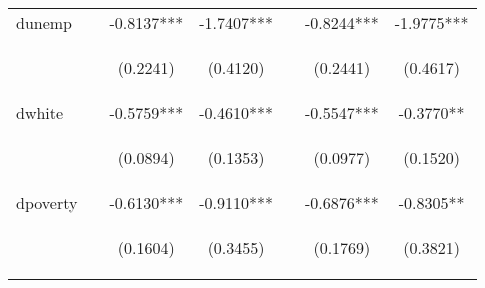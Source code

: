 \begin{center}
\begin{tabular}{lcccccc}
dunemp &  & -0.8137*** & -1.7407*** &  & -0.8244*** & -1.9775*** \\
\vspace{4pt} & \begin{footnotesize}\end{footnotesize} & \begin{footnotesize}(0.2241)\end{footnotesize} & \begin{footnotesize}(0.4120)\end{footnotesize} & \begin{footnotesize}\end{footnotesize} & \begin{footnotesize}(0.2441)\end{footnotesize} & \begin{footnotesize}(0.4617)\end{footnotesize} \\
dwhite &  & -0.5759*** & -0.4610*** &  & -0.5547*** & -0.3770** \\
\vspace{4pt} & \begin{footnotesize}\end{footnotesize} & \begin{footnotesize}(0.0894)\end{footnotesize} & \begin{footnotesize}(0.1353)\end{footnotesize} & \begin{footnotesize}\end{footnotesize} & \begin{footnotesize}(0.0977)\end{footnotesize} & \begin{footnotesize}(0.1520)\end{footnotesize} \\
dpoverty &  & -0.6130*** & -0.9110*** &  & -0.6876*** & -0.8305** \\
\vspace{4pt} & \begin{footnotesize}\end{footnotesize} & \begin{footnotesize}(0.1604)\end{footnotesize} & \begin{footnotesize}(0.3455)\end{footnotesize} & \begin{footnotesize}\end{footnotesize} & \begin{footnotesize}(0.1769)\end{footnotesize} & \begin{footnotesize}(0.3821)\end{footnotesize} \\

\end{tabular}
\end{center}

